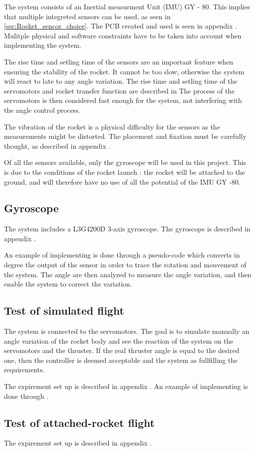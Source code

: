 The system consists of an Inertial measurment Unit (IMU) GY - 80. This implies that multiple integreted sensors can be used, as seen in \autoref{sec:Rocket_sencor_choice}. The PCB created and used is seen in appendix . 
Mulitple physical and software constraints have to be taken into account when implementing the system.

The rise time and setling time of the sensors are an important feature when ensuring the stability of the rocket. It cannot be too slow, otherwise the system will react to late to any angle variation. The rise time and setling time of the servomotors and rocket transfer function are described in %
 The process of the servomotors is then considered fast enough for the system, not interfering with the angle control process.

The vibration of the rocket is a physical difficulty for the sensors as the measurements might be distorted. The placement and fixation must be carefully thought, as described in appendix .

Of all the sensors available, only the gyroscope will be used in this project. This is due to the conditions of the rocket launch : the rocket will be attached to the ground, and will therefore have no use of all the potential of the IMU GY -80.

\subsection*{Gyroscope}

The system includes a L3G4200D 3-axis gyroscope. The gyroscope is described in appendix . 

An example of implementing is done through a pseudo-code which converts in degree the output of the sensor in order to trace the rotation and mouvement of the system. The angle are then analyzed to measure the angle variation, and then enable the system to correct the variation.

\subsection{Test of simulated flight}

The system is connected to the servomotors. The goal is to simulate manually an angle variation of the rocket body and see the reaction of the system on the servomotors and the thruster. If the real thruster angle is equal to the desired one, then the controller is deemed acceptable and the system as fullfilling the requirements.

The expirement set up is described in appendix . An example of implementing is done through 
.

\subsection{Test of attached-rocket flight}

The expirement set up is described in appendix . 